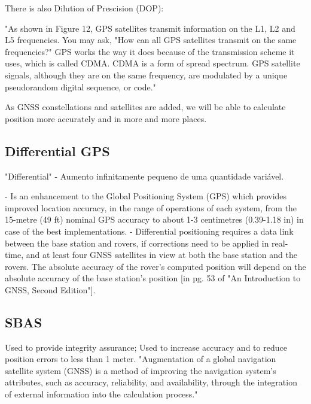 There is also Dilution of Prescision (DOP): %

"As shown in Figure 12, GPS satellites transmit information on the L1, L2 and L5 frequencies. You may ask, "How can all GPS satellites
transmit on the same frequencies?"
GPS works the way it does because of the transmission scheme it uses, which is called CDMA. CDMA is a form of spread spectrum. GPS satellite signals, although they are on the same frequency, are modulated by a unique pseudorandom digital sequence, or code."

As GNSS constellations and satellites are added, we will be able to calculate position more accurately and in more and more places.


\subsection{Differential GPS}\label{sec:II_gnss_dgps}

"Differential" - Aumento infinitamente pequeno de uma quantidade variável.

- Is an enhancement to the Global Positioning System (GPS) which provides improved location accuracy, in the range of operations of each system, from the 15-metre (49 ft) nominal GPS accuracy to about 1-3 centimetres (0.39-1.18 in) in case of the best implementations.
- Differential positioning requires a data link between the base station and rovers, if corrections need to be applied in real-time, and at least four GNSS satellites in view at both the base station and the rovers. The absolute accuracy of the rover's computed position will depend on the absolute accuracy of the base station's position [in pg. 53 of "An Introduction to GNSS, Second Edition"].

\subsection{SBAS}\label{sec:II_gnss_sbas}

Used to provide integrity assurance;
Used to increase accuracy and to reduce position errors to less than 1 meter.
"Augmentation of a global navigation satellite system (GNSS) is a method of improving the navigation system's attributes, such as accuracy, reliability, and availability, through the integration of external information into the calculation process."

